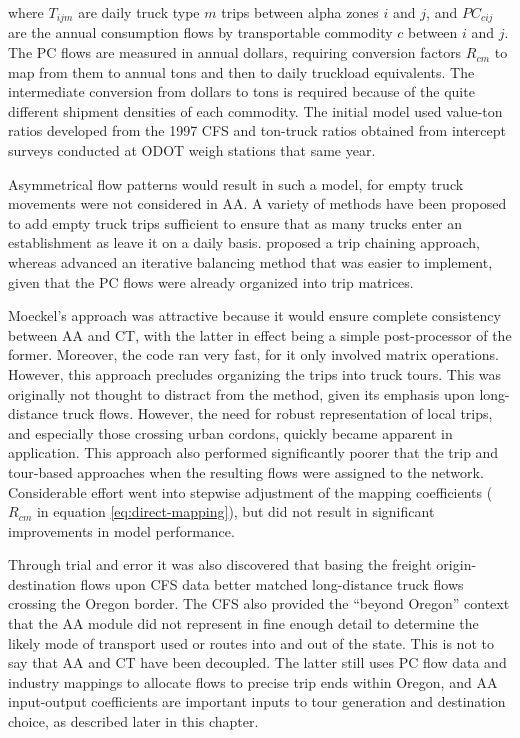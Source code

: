 \noindent where $T_{ijm}$ are daily truck type $m$ trips between alpha zones $i$ and $j$, and $PC_{cij}$ are the annual consumption flows by transportable commodity $c$ between $i$ and $j$. The PC flows are measured in annual dollars, requiring conversion factors $R_{cm}$ to map from them to annual tons and then to daily truckload equivalents. The intermediate conversion from dollars to tons is required because of the quite different shipment densities of each commodity. The initial model used value-ton ratios developed from the 1997 CFS and ton-truck ratios obtained from intercept surveys conducted at ODOT weigh stations that same year.

Asymmetrical flow patterns would result in such a model, for empty truck movements were not considered in AA. A variety of methods have been proposed to add empty truck trips sufficient to ensure that as many trucks enter an establishment as leave it on a daily basis. \cite{holguinveras03} proposed a trip chaining approach, whereas \cite{moeckel16} advanced an iterative balancing method that was easier to implement, given that the PC flows were already organized into trip matrices.

Moeckel's approach was attractive because it would ensure complete consistency between AA and CT, with the latter in effect being a simple post-processor of the former. Moreover, the code ran very fast, for it only involved matrix operations. However, this approach precludes organizing the trips into truck tours. This was originally not thought to distract from the method, given its emphasis upon long-distance truck flows. However, the need for robust representation of local trips, and especially those crossing urban cordons, quickly became apparent in application. This approach also performed significantly poorer that the trip and tour-based approaches when the resulting flows were assigned to the network. Considerable effort went into stepwise adjustment of the mapping coefficients ($R_{cm}$ in equation \ref{eq:direct-mapping}), but did not result in significant improvements in model performance.

Through trial and error it was also discovered that basing the freight origin-destination flows upon CFS data better matched long-distance truck flows crossing the Oregon border. The CFS also provided the ``beyond Oregon'' context that the AA module did not represent in fine enough detail to determine the likely mode of transport used or routes into and out of the state. This is not to say that AA and CT have been decoupled. The latter still uses PC flow data and industry mappings to allocate flows to precise trip ends within Oregon, and AA input-output coefficients are important inputs to tour generation and destination choice, as described later in this chapter.

